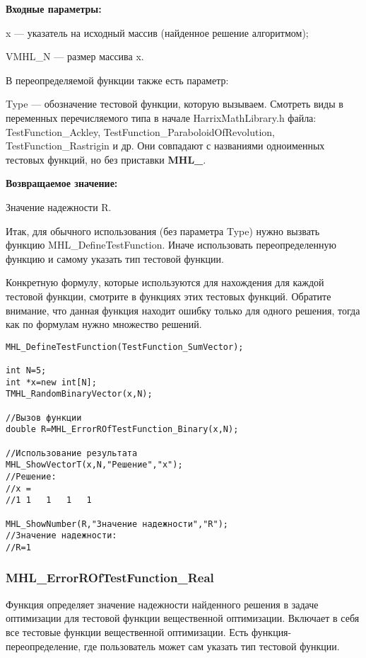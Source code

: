 \documentclass[a4paper,12pt]{article}
\begin{document}
\textbf{Входные параметры:}

x --- указатель на исходный массив (найденное решение алгоритмом);

VMHL\_N --- размер массива x.

В переопределяемой функции также есть параметр:
  
Type --- обозначение тестовой функции, которую вызываем.
Смотреть виды в переменных перечисляемого типа в начале HarrixMathLibrary.h файла: TestFunction\_Ackley, TestFunction\_ParaboloidOfRevolution, TestFunction\_Rastrigin и др. Они совпадают с названиями одноименных тестовых функций, но без приставки \textbf{MHL\_}.

\textbf{Возвращаемое значение:}
 
Значение надежности R.

Итак, для обычного использования (без параметра Type) нужно вызвать функцию MHL\_DefineTestFunction. Иначе использовать переопределенную функцию и самому указать тип тестовой функции.

Конкретную формулу, которые используются для нахождения для каждой тестовой функции, смотрите в функциях этих тестовых функций. Обратите внимание, что данная функция находит ошибку только для одного решения, тогда как по формулам нужно множество решений.


\begin{lstlisting}[label=code_use_MHL_ErrorROfTestFunction_Binary,caption=Пример использования]
MHL_DefineTestFunction(TestFunction_SumVector);

int N=5;
int *x=new int[N];
TMHL_RandomBinaryVector(x,N);

//Вызов функции
double R=MHL_ErrorROfTestFunction_Binary(x,N);

//Использование результата
MHL_ShowVectorT(x,N,"Решение","x");
//Решение:
//x =
//1	1	1	1	1

MHL_ShowNumber(R,"Значение надежности","R");
//Значение надежности:
//R=1
\end{lstlisting}

\subsubsection{MHL\_ErrorROfTestFunction\_Real}\label{MHL_ErrorROfTestFunction_Real}

Функция определяет значение надежности найденного решения в задаче оптимизации для тестовой функции вещественной оптимизации. Включает в себя все тестовые функции  вещественной оптимизации. Есть функция-переопределение, где пользователь может сам указать тип тестовой функции.
\end{document}
